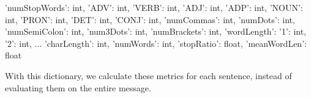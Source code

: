 \begin{python}
{
	'numStopWords': int,
	'ADV': int,
	'VERB': int,
	'ADJ': int,
	'ADP': int,
	'NOUN': int,
	'PRON': int,
	'DET': int,
	'CONJ': int,
	'numCommas': int,
	'numDots': int,
	'numSemiColon': int,
	'num3Dots': int,
	'numBrackets': int,
	'wordLength':
	{
		'1': int,
		'2': int,
		...
	}
	'charLength': int,
	'numWords': int,
	'stopRatio': float,
	'meanWordLen': float
}
\end{python}

With this dictionary, we calculate these metrics for each sentence, instead of evaluating them on the entire message.